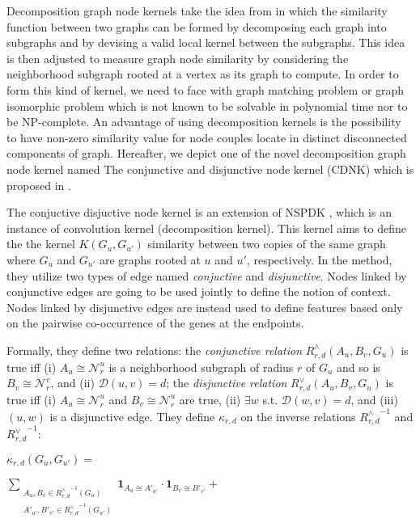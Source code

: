 \documentclass{article}
\begin{document}
Decomposition graph node kernels take the idea from \cite{?} in which the similarity function between two graphs can be formed by decomposing each graph into subgraphs and by devising a valid local kernel between the subgraphs. This idea is then adjusted to measure graph node similarity by considering the neighborhood subgraph rooted at a vertex as its graph to compute. In order to form this kind of kernel, we need to face with graph matching problem or graph isomorphic problem which is not known to be solvable in polynomial time nor to be NP-complete. An advantage of using decomposition kernels is the possibility to have non-zero similarity value for node couples locate in distinct disconnected components of graph. Hereafter, we depict one of the novel decomposition graph node kernel named The conjunctive and disjunctive node kernel (CDNK) which is proposed in \cite{?}.

The conjuctive disjuctive node kernel is an extension of NSPDK \cite{?}, which is an instance of convolution kernel (decomposition kernel). This kernel aims to define the the kernel $K(G_u, G_{u'})$ similarity between two copies of the same graph where $G_u$ and $G_{u'}$ are graphs rooted at $u$ and $u'$, respectively. In the method, they utilize two types of edge named \textit{conjuctive} and \textit{disjunctive}. Nodes linked by conjunctive edges are going to be used jointly to define the notion of context. Nodes linked by disjunctive edges are instead used to define features based only on the pairwise co-occurrence of the genes at the endpoints.

Formally, they define two relations: the \textit{conjunctive relation} $R^{\wedge}_{r,d}(A_u, B_v, G_u)$ is true iff (i) $A_u \cong \mathcal{N}_r^u$ is a neighborhood subgraph of radius $r$ of $G_u$ and so is $B_v \cong \mathcal{N}_r^v$,  and (ii) $\mathcal{D}(u,v)= d$; the \textit{disjunctive relation} $R_{r,d}^{\vee}(A_u, B_v, G_u)$ is true iff (i)  $A_u \cong \mathcal{N}_r^u$ and $B_v \cong \mathcal{N}_r^u$ are true, (ii) $\exists w$ s.t. $\mathcal{D}(w,v)= d$, and (iii) $(u,w)$ is a disjunctive edge. They define $\kappa_{r,d}$ on the  inverse relations ${R^{\wedge}_{r,d}}^{ -1}$ and ${R^{\vee}_{r,d}}^{ -1}$:

 $\kappa_{r,d}(G_u,G_{u'}) = $
 \begin{center}
$ \sum\limits_{\substack {A_u,{B}_{v} \in {R_{r,d}^{\wedge}}^{ -1}(G_u) \\ A'_{u'},{B'}_{v'} \in {R_{r,d}^{\wedge}}^{ -1}(G_{u'}) }} { \textbf{1}_{A_u \cong A'_{u'}} \cdot { \textbf{1}_{B_{v} \cong B'_{v'}}}} + $
\end{center}
\end{document}

